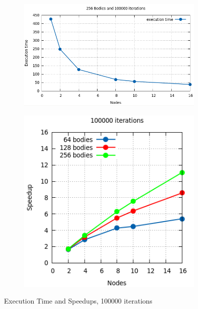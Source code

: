 \documentclass[a4paper]{article}
\begin{document}
\begin{figure}[ht]
\begin{subfigure}{.5\textwidth}
\end{subfigure} \\ %
\begin{subfigure}{.5\textwidth}
  \centering
  \includegraphics[width=1\linewidth]{results/graph5}
\end{subfigure} %
\begin{subfigure}{.5\textwidth}
  \centering
  \includegraphics[width=1\linewidth]{results/graph5_sp}
\end{subfigure}
  \caption{Execution Time and Speedups, 100000 iterations}
  \label{fig:R1}
\end{figure}
\FloatBarrier
\end{document}
